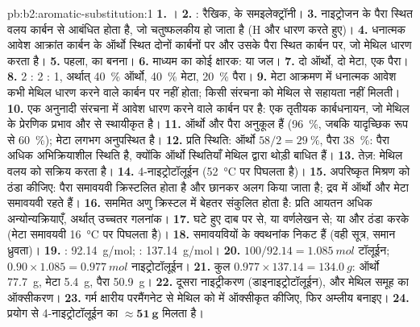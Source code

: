 \begin{solution}{pb:b2:aromatic-substitution:1}
\textbf{1.} ।
\textbf{2.} : रैखिक,  के समइलेक्ट्रॉनी।
\textbf{3.} नाइट्रोजन  के पैरा स्थित वलय कार्बन से आबंधित होता है, जो चतुष्फलकीय हो जाता है
(H और  धारण करते हुए)।
\textbf{4.} धनात्मक आवेश आक्रांत कार्बन के ऑर्थो स्थित दोनों कार्बनों पर और उसके पैरा स्थित
कार्बन पर, जो मेथिल धारण करता है।
\textbf{5.} पहला,  का बनना।
\textbf{6.} माध्यम का कोई क्षारक:  या जल।
\textbf{7.} दो ऑर्थो, दो मेटा, एक पैरा।
\textbf{8.} 2 : 2 : 1, अर्थात् 40~\% ऑर्थो, 40~\% मेटा, 20~\% पैरा।
\textbf{9.} मेटा आक्रमण में धनात्मक आवेश कभी मेथिल धारण करने वाले कार्बन पर नहीं होता; किसी
संरचना को मेथिल से सहायता नहीं मिलती।
\textbf{10.} एक अनुनादी संरचना में आवेश  धारण करने वाले कार्बन पर है: एक तृतीयक
कार्बधनायन, जो मेथिल के प्रेरणिक प्रभाव और  से स्थायीकृत है।
\textbf{11.} ऑर्थो और पैरा अनुकूल हैं (96~\%, जबकि यादृच्छिक रूप से 60~\%); मेटा लगभग अनुपस्थित है।
\textbf{12.} प्रति स्थिति: ऑर्थो $58/2 = 29~\%$, पैरा 38~\%: पैरा अधिक अभिक्रियाशील स्थिति है,
क्योंकि ऑर्थो स्थितियाँ मेथिल द्वारा थोड़ी बाधित हैं।
\textbf{13.} तेज़: मेथिल वलय को सक्रिय करता है।
\textbf{14.} 4-नाइट्रोटॉलूईन (\qty{52}{\degreeCelsius} पर पिघलता है)।
\textbf{15.} अपरिष्कृत मिश्रण को ठंडा कीजिए: पैरा समावयवी क्रिस्टलित होता है और छानकर अलग किया जाता है;
द्रव में ऑर्थो और मेटा समावयवी रहते हैं।
\textbf{16.} सममित अणु क्रिस्टल में बेहतर संकुलित होता है: प्रति आयतन अधिक अन्योन्यक्रियाएँ,
अर्थात् उच्चतर गलनांक।
\textbf{17.} घटे हुए दाब पर  से, या वर्णलेखन से; या
और ठंडा करके (मेटा समावयवी \qty{16}{\degreeCelsius} पर पिघलता है)।
\textbf{18.} समावयवियों के क्वथनांक निकट हैं (वही सूत्र, समान ध्रुवता)।
\textbf{19.} : \qty{92.14}{g/mol}; : \qty{137.14}{g/mol}।
\textbf{20.} $100/92.14 = \qty{1.085}{mol}$ टॉलूईन; $0.90 \times 1.085 = \qty{0.977}{mol}$
नाइट्रोटॉलूईन।
\textbf{21.} कुल $0.977 \times 137.14 = \qty{134.0}{g}$: ऑर्थो \qty{77.7}{g}, मेटा
\qty{5.4}{g}, पैरा \qty{50.9}{g}।
\textbf{22.} दूसरा नाइट्रीकरण (डाइनाइट्रोटॉलूईन), और मेथिल समूह का ऑक्सीकरण।
\textbf{23.} गर्म क्षारीय परमैंगनेट से मेथिल को  में ऑक्सीकृत कीजिए, फिर अम्लीय बनाइए।
\textbf{24.} प्रयोग से 4-नाइट्रोटॉलूईन का $\boldsymbol{\approx \qty{51}{g}}$ मिलता है।
\end{solution}
